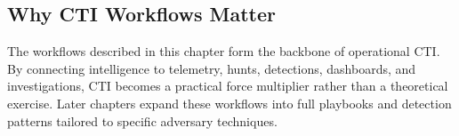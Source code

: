
\subsection*{Why CTI Workflows Matter}

The workflows described in this chapter form the backbone of operational CTI. By connecting intelligence to telemetry, 
hunts, detections, dashboards, and investigations, CTI becomes a practical force multiplier rather than a theoretical 
exercise. Later chapters expand these workflows into full playbooks and detection patterns tailored to specific adversary 
techniques.
